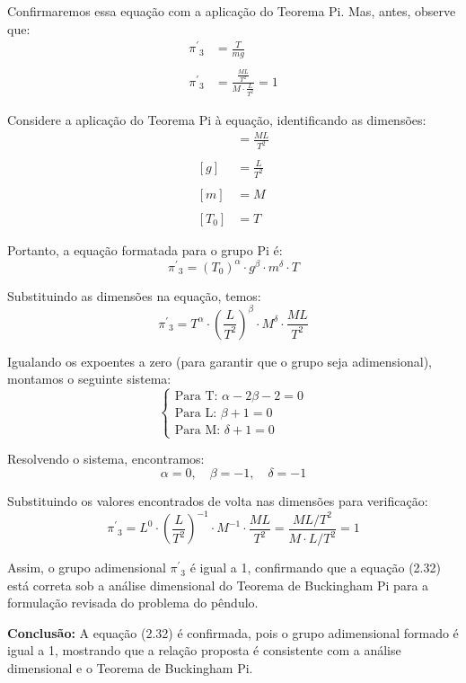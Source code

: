 
\vspace{0.5cm}
\noindent Confirmaremos essa equação com a aplicação do Teorema Pi. Mas, antes, observe que:
\begin{align*}
{\pi^{\prime}}_{3} &= \frac{T}{mg} \\ \\
{\pi^{\prime}}_{3} &= \frac{\frac{ML}{T^{2}}}{M \cdot \frac{L}{T^{2}}} = 1
\end{align*}

\noindent Considere a aplicação do Teorema Pi à equação, identificando as dimensões:
\begin{align*}
[T] &= \frac{ML}{T^{2}} \\\\
[g] &= \frac{L}{T^{2}} \\\\
[m] &= M \\\\
[T_{0}] &= T
\end{align*}

\noindent Portanto, a equação formatada para o grupo Pi é:
\[ {\pi^{\prime}}_{3} = (T_{0})^{\alpha} \cdot g^{\beta} \cdot m^{\delta} \cdot T \]

\noindent Substituindo as dimensões na equação, temos:
\[ {\pi^{\prime}}_{3} = T^{\alpha} \cdot \left(\frac{L}{T^{2}}\right)^{\beta} \cdot M^{\delta} \cdot \frac{ML}{T^{2}} \]

\noindent Igualando os expoentes a zero (para garantir que o grupo seja adimensional), montamos o seguinte sistema:
\[
\begin{cases}
\text{Para T: } \alpha - 2\beta - 2 = 0 \\
\text{Para L: } \beta + 1 = 0 \\
\text{Para M: } \delta + 1 = 0
\end{cases}
\]

\noindent Resolvendo o sistema, encontramos:
\[ \alpha = 0, \quad \beta = -1, \quad \delta = -1 \]

\noindent Substituindo os valores encontrados de volta nas dimensões para verificação:
\[ {\pi^{\prime}}_{3} = L^{0} \cdot \left(\frac{L}{T^{2}}\right)^{-1} \cdot M^{-1} \cdot \frac{ML}{T^{2}} = \frac{ML/T^2}{M \cdot L/T^2} = 1 \]

\noindent Assim, o grupo adimensional ${\pi^{\prime}}_{3}$ é igual a 1, confirmando que a equação (2.32) está correta sob a análise dimensional do Teorema de Buckingham Pi para a formulação revisada do problema do pêndulo.

\vspace{0.5cm}
\noindent \textbf{Conclusão:} A equação (2.32) é confirmada, pois o grupo adimensional formado é igual a 1, mostrando que a relação proposta é consistente com a análise dimensional e o Teorema de Buckingham Pi.